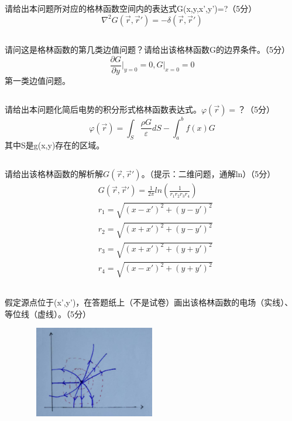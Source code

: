 \documentclass[UTF8]{ctexart}
\begin{document}
\subsection{}
\paragraph{}
请给出本问题所对应的格林函数空间内的表达式G(x,y,x',y')=?（5分）
\[\nabla^2G(\vec r,\vec r')=-\delta(\vec r,\vec r')\]
\subsection{}
\paragraph{}
请问这是格林函数的第几类边值问题？请给出该格林函数G的边界条件。（5分）
\[\frac{\partial G}{\partial y}\lvert_{y=0}=0, G\lvert_{x=0}=0\]
第一类边值问题。
\subsection{}
\paragraph{}
请给出本问题化简后电势的积分形式格林函数表达式。$\varphi(\vec r)=$？（5分）
\[\varphi(\vec r)=\int_S^{}{\frac{\rho G}{\varepsilon}dS}-\int_a^b{f(x)G}\]
其中S是g(x,y)存在的区域。
\subsection{}
\paragraph{}
请给出该格林函数的解析解$G(\vec r,\vec r')$。（提示：二维问题，通解ln）（5分）
\begin{equation*}
\begin{aligned}
&G(\vec r,\vec r')=\frac{1}{2\pi}ln(\frac{1}{r_1r_2r_3r_4})\\
&r_1=\sqrt{(x-x')^2+(y-y')^2}\\
&r_2=\sqrt{(x+x')^2+(y-y')^2}\\
&r_3=\sqrt{(x+x')^2+(y+y')^2}\\
&r_4=\sqrt{(x-x')^2+(y+y')^2}
\end{aligned}
\end{equation*}
\subsection{}
\paragraph{}
假定源点位于(x',y')，在答题纸上（不是试卷）画出该格林函数的电场（实线）、等位线（虚线）。（5分）
\begin{figure}[H]
\centering
\includegraphics[width=6cm,height=4cm]{2015-5.jpg}
\end{figure}
\end{document}
